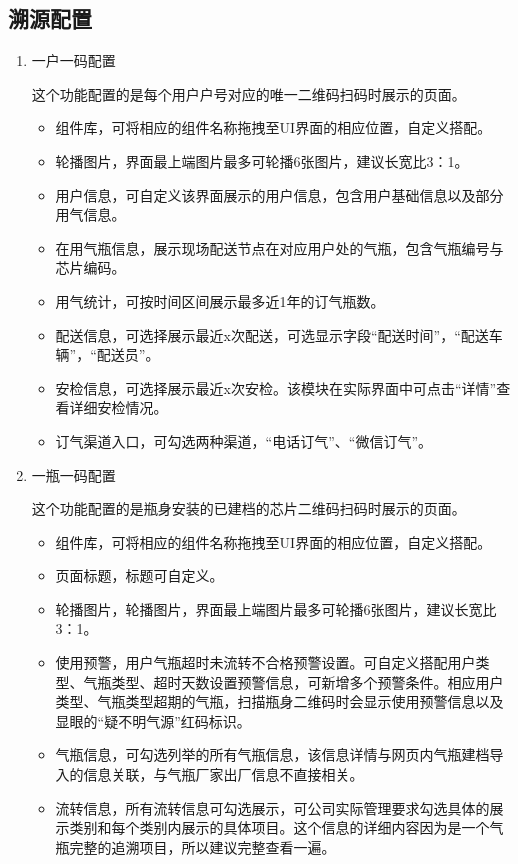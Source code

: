 \documentclass[UTF8]{ctexart}
\begin{document}
\subsection{溯源配置}
\begin{enumerate}
	
	\item 一户一码配置
	
	这个功能配置的是每个用户户号对应的唯一二维码扫码时展示的页面。
	
	\begin{itemize}
		\item 组件库，可将相应的组件名称拖拽至UI界面的相应位置，自定义搭配。
		\item 轮播图片，界面最上端图片最多可轮播6张图片，建议长宽比3：1。
		\item 用户信息，可自定义该界面展示的用户信息，包含用户基础信息以及部分用气信息。
		\item 在用气瓶信息，展示现场配送节点在对应用户处的气瓶，包含气瓶编号与芯片编码。
		\item 用气统计，可按时间区间展示最多近1年的订气瓶数。
		\item 配送信息，可选择展示最近x次配送，可选显示字段“配送时间”，“配送车辆”，“配送员”。
		\item 安检信息，可选择展示最近x次安检。该模块在实际界面中可点击“详情”查看详细安检情况。
		\item 订气渠道入口，可勾选两种渠道，“电话订气”、“微信订气”。
	\end{itemize}
	
	\item 一瓶一码配置
	
	这个功能配置的是瓶身安装的已建档的芯片二维码扫码时展示的页面。
	
	\begin{itemize}
		\item 组件库，可将相应的组件名称拖拽至UI界面的相应位置，自定义搭配。
		\item 页面标题，标题可自定义。
		\item 轮播图片，轮播图片，界面最上端图片最多可轮播6张图片，建议长宽比3：1。
		\item 使用预警，用户气瓶超时未流转不合格预警设置。可自定义搭配用户类型、气瓶类型、超时天数设置预警信息，可新增多个预警条件。相应用户类型、气瓶类型超期的气瓶，扫描瓶身二维码时会显示使用预警信息以及显眼的“疑不明气源”红码标识。
		\item 气瓶信息，可勾选列举的所有气瓶信息，该信息详情与网页内气瓶建档导入的信息关联，与气瓶厂家出厂信息不直接相关。
		\item 流转信息，所有流转信息可勾选展示，可公司实际管理要求勾选具体的展示类别和每个类别内展示的具体项目。这个信息的详细内容因为是一个气瓶完整的追溯项目，所以建议完整查看一遍。
	\end{itemize}
	

\end{enumerate}
\end{document}
